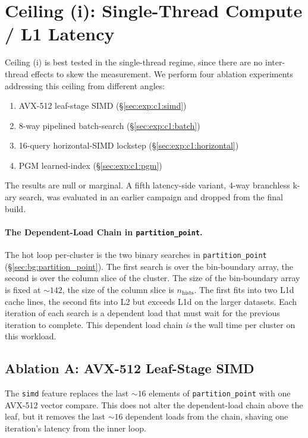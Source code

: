 \section{Ceiling (i): Single-Thread Compute / L1 Latency\label{sec:exp:c1}}

Ceiling (i) is best tested in the single-thread regime, since there are no inter-thread effects to skew the measurement. We perform four ablation experiments addressing this ceiling from different angles: 
\begin{enumerate}
  \item AVX-512 leaf-stage SIMD (§\ref{sec:exp:c1:simd})
  \item 8-way pipelined batch-search (§\ref{sec:exp:c1:batch})
  \item 16-query horizontal-SIMD lockstep (§\ref{sec:exp:c1:horizontal})
  \item PGM learned-index (§\ref{sec:exp:c1:pgm})
\end{enumerate}

The results are null or marginal. A fifth latency-side variant, 4-way branchless k-ary search, was evaluated in an earlier campaign and dropped from the final build.

\paragraph{The Dependent-Load Chain in \texttt{partition\_point}.}

The hot loop per-cluster is the two binary searches in \texttt{partition\_point} (§\ref{sec:bg:partition_point}). The first search is over the bin-boundary array, the second is over the column slice of the cluster. The size of the bin-boundary array is fixed at ${\sim}142$, the size of the column slice is $n_\text{hists}$. The first fits into two L1d cache lines, the second fits into L2 but exceeds L1d on the larger datasets. Each iteration of each search is a dependent load that must wait for the previous iteration to complete. This dependent load chain \emph{is} the wall time per cluster on this workload.

\subsection{Ablation A: AVX-512 Leaf-Stage SIMD\label{sec:exp:c1:simd}}

The \texttt{simd} feature replaces the last ${\sim}16$ elements of \texttt{partition\_point} with one AVX-512 vector compare. This does not alter the dependent-load chain above the leaf, but it removes the last ${\sim}16$ dependent loads from the chain, shaving one iteration's latency from the inner loop.

